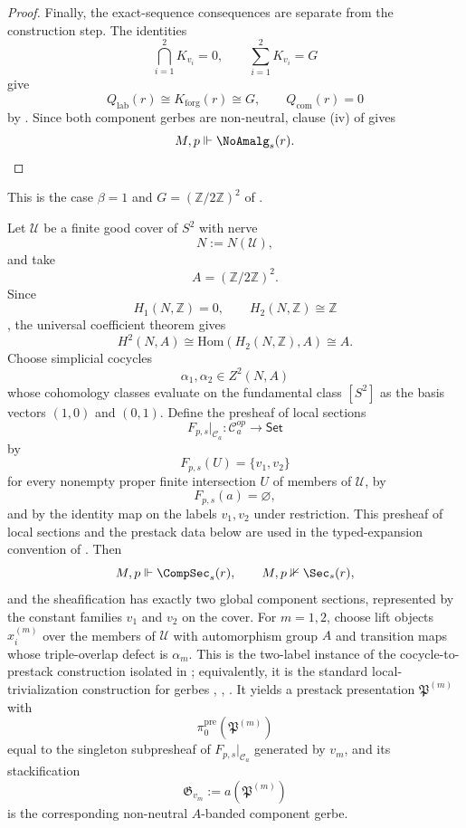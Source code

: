 \begin{proof}
Finally, the exact-sequence consequences are separate from the construction step. The identities
\[
\bigcap_{i=1}^2 K_{v_i}=0,
\qquad
\sum_{i=1}^2 K_{v_i}=G
\]
give
\[
Q_{\mathrm{lab}}(r)\cong K_{\mathrm{forg}}(r)\cong G,
\qquad
Q_{\mathrm{com}}(r)=0
\]
by . Since both component gerbes are non-neutral, clause \textup{(iv)} of  gives
\[
M,p\Vdash \NoAmalg_s(r).
\]
\end{proof}

\begin{example}\label{ex:two-branch-sphere-separation}
This is the case $\beta=1$ and $G=(\mathbb Z/2\mathbb Z)^2$ of .

Let $\mathcal U$ be a finite good cover of $S^2$ with nerve
\[
N:=N(\mathcal U),
\]
and take
\[
A=(\mathbb Z/2\mathbb Z)^2.
\]
Since
\[
H_1(N,\mathbb Z)=0,
\qquad
H_2(N,\mathbb Z)\cong \mathbb Z
\]
\cite[Secs.~2.1, 2.2]{Hatcher2002}, the universal coefficient theorem gives
\[
H^2(N,A)\cong \mathrm{Hom}(H_2(N,\mathbb Z),A)\cong A.
\]
Choose simplicial cocycles
\[
\alpha_1,\alpha_2\in Z^2(N,A)
\]
whose cohomology classes evaluate on the fundamental class $[S^2]$ as the basis vectors $(1,0)$ and $(0,1)$. Define the presheaf of local sections
\[
F_{p,s}|_{\mathcal C_a}:\mathcal C_a^{op}\to\mathsf{Set}
\]
by
\[
F_{p,s}(U)=\{v_1,v_2\}
\]
for every nonempty proper finite intersection $U$ of members of $\mathcal U$, by
\[
F_{p,s}(a)=\varnothing,
\]
and by the identity map on the labels $v_1,v_2$ under restriction. This presheaf
of local sections and the prestack data below are used in the typed-expansion
convention of . Then
\[
M,p\Vdash \CompSec_s(r),
\qquad
M,p\nVdash \Sec_s(r),
\]
and the sheafification has exactly two global component sections, represented by the constant families $v_1$ and $v_2$ on the cover. For $m=1,2$, choose lift objects $x_i^{(m)}$ over the members of $\mathcal U$ with automorphism group $A$ and transition maps whose triple-overlap defect is $\alpha_m$. This is the two-label instance of the cocycle-to-prestack construction isolated in ; equivalently, it is the standard local-trivialization construction for gerbes \cite[Chap.~IV]{Giraud1971}, \cite[Sec.~5]{Breen2006}, \cite{Murray1996}. It yields a prestack presentation $\mathfrak P^{(m)}$ with
\[
\pi_0^{\mathrm{pre}}(\mathfrak P^{(m)})
\]
equal to the singleton subpresheaf of $F_{p,s}|_{\mathcal C_a}$ generated by $v_m$, and its stackification
\[
\mathfrak G_{v_m}:=a(\mathfrak P^{(m)})
\]
is the corresponding non-neutral $A$-banded component gerbe.


\end{example}
